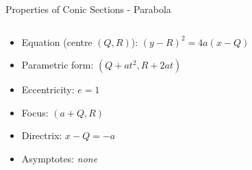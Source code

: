 \documentclass[10pt]{beamer}
\begin{document}
\begin{frame}{Properties of Conic Sections - Parabola}
{\begin{columns}
      \begin{column}{0.5\textwidth}
        \begin{itemize}[<+->]
          \item Equation (centre $(Q,R)$): $(y-R)^2 = 4a(x-Q)$
          \item Parametric form: $(Q+at^2,R+2at)$
          \item Eccentricity: $e = 1$
          \item Focus: $(a+Q,R)$
          \item Directrix: $x-Q = -a$
          \item Asymptotes: \textit{none}
        \end{itemize}
      \end{column}
    \end{columns}
  }
\end{frame}
\end{document}
